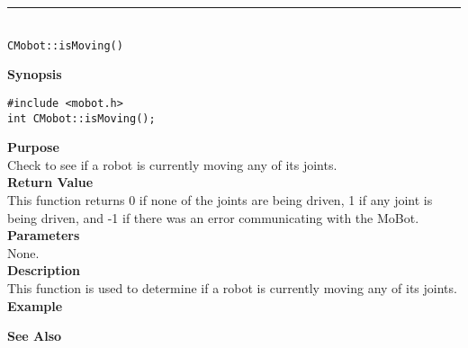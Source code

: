 \noindent
\vspace{5pt}
\rule{4.5in}{0.015in}\\
\noindent
{\LARGE \texttt{CMobot::isMoving()}}\\
{}

\noindent
{\bf Synopsis}\\
\begin{verbatim}
#include <mobot.h>
int CMobot::isMoving();
\end{verbatim}

\noindent
{\bf Purpose}\\
Check to see if a robot is currently moving any of its joints.\\

\noindent
{\bf Return Value}\\
This function returns 0 if none of the joints are being driven, 1 if any joint
is being driven, and -1 if there was an error communicating with the MoBot.\\

\noindent
{\bf Parameters}\\
None.\\

\noindent
{\bf Description}\\
This function is used to determine if a robot is currently moving any of
its joints. \\

\noindent
{\bf Example}\\
\noindent

\noindent
{\bf See Also}\\

